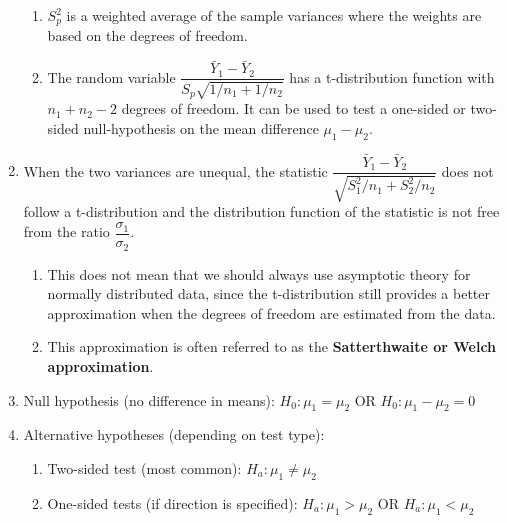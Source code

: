 \begin{enumerate}
\begin{enumerate}
        \item $S^2_p$ is a weighted average of the sample variances where the weights are based on the degrees of freedom.
        \hfill \cite{statistics/book/Statistics-for-Data-Scientists/Maurits-Kaptein}
    
        \item The random variable $\dfrac{\bar{Y}_1 - \bar{Y}_2}{S _p \sqrt{1/n_1 + 1/n_2}}$ has a t-distribution function with $n_1 + n_2 - 2$ degrees of freedom. It can be used to test a one-sided or two-sided null-hypothesis on the mean difference $\mu_1 - \mu_2 $.
        \hfill \cite{statistics/book/Statistics-for-Data-Scientists/Maurits-Kaptein}
    \end{enumerate}

    \item When the two variances are unequal, the statistic $\dfrac{\bar{Y}_1 - \bar{Y}_2}{ \sqrt{S^2_1/n_1 + S^2_2/n_2}}$ does not follow a t-distribution and the distribution function of the statistic is not free from the ratio $\dfrac{\sigma_1}{\sigma_2}$.
    \hfill \cite{statistics/book/Statistics-for-Data-Scientists/Maurits-Kaptein}
    \begin{enumerate}
        \item This does not mean that we should always use asymptotic theory for normally distributed data, since the t-distribution still provides a better approximation when the degrees of freedom are estimated from the data. 
        \hfill \cite{statistics/book/Statistics-for-Data-Scientists/Maurits-Kaptein}
        
        \item This approximation is often referred to as the \textbf{Satterthwaite or Welch approximation}.
        \hfill \cite{statistics/book/Statistics-for-Data-Scientists/Maurits-Kaptein}
    \end{enumerate}

    \item Null hypothesis (no difference in means): $H_0:\mu_1=\mu_2$ OR $H_0:\mu_1-\mu_2=0$
    \hfill \cite{common/online/chatgpt}

    \item Alternative hypotheses (depending on test type):
    \hfill \cite{common/online/chatgpt}
    \begin{enumerate}
        \item Two-sided test (most common): $H_a:\mu_1\neq\mu_2$
        \hfill \cite{common/online/chatgpt}

        \item One-sided tests (if direction is specified): $H_a:\mu_1 > \mu_2$ OR $H_a:\mu_1 < \mu_2$
        \hfill \cite{common/online/chatgpt}
    \end{enumerate}


\end{enumerate}
